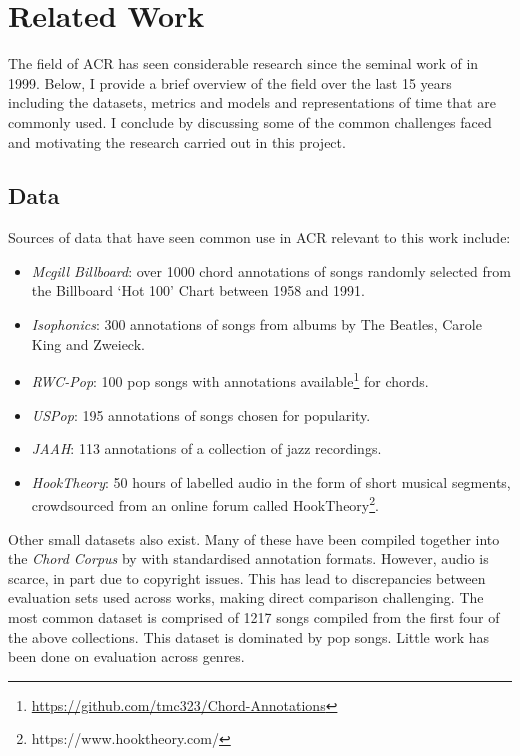 \section{Related Work}\label{sec:related_work}

The field of ACR has seen considerable research since the seminal work of \citet{FujishimaACR} in 1999. Below, I provide a brief overview of the field over the last 15 years including the datasets, metrics and models and representations of time that are commonly used. I conclude by discussing some of the common challenges faced and motivating the research carried out in this project. 

\subsection{Data}

Sources of data that have seen common use in ACR relevant to this work include:

\begin{itemize}
    \item \emph{Mcgill Billboard}: over 1000 chord annotations of songs randomly selected from the Billboard `Hot 100' Chart between 1958 and 1991.~\citep{McgillBillboard}
    \item \emph{Isophonics}: 300 annotations of songs from albums by The Beatles, Carole King and Zweieck.~\citep{Isophonics}
    \item \emph{RWC-Pop}: 100 pop songs with annotations available\footnote{\url{https://github.com/tmc323/Chord-Annotations}} for chords.~\citep{RWC}
    \item \emph{USPop}: 195 annotations of songs chosen for popularity.~\citep{USPop}
    \item \emph{JAAH}: 113 annotations of a collection of jazz recordings.~\citep{JAAH}
    \item \emph{HookTheory}: 50 hours of labelled audio in the form of short musical segments, crowdsourced from an online forum called HookTheory\footnote{https://www.hooktheory.com/}.~\citep{MelodyTranscriptionViaGenerativePreTraining}
\end{itemize}

Other small datasets also exist. Many of these have been compiled together into the \emph{Chord Corpus} by \citet{Choco} with standardised annotation formats. However, audio is scarce, in part due to copyright issues. This has lead to discrepancies between evaluation sets used across works, making direct comparison challenging. The most common dataset is comprised of 1217 songs compiled from the first four of the above collections. This dataset is dominated by pop songs. Little work has been done on evaluation across genres.

